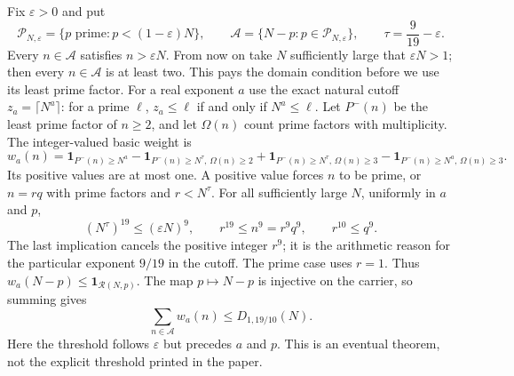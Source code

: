 Fix $\varepsilon>0$ and put
\[
 \mathcal P_{N,\varepsilon}=\{p\text{ prime}:p<(1-\varepsilon)N\},\qquad
 \mathcal A=\{N-p:p\in\mathcal P_{N,\varepsilon}\},\qquad
 \tau=\frac9{19}-\varepsilon.
\]
Every $n\in\mathcal A$ satisfies $n>\varepsilon N$.
From now on take $N$ sufficiently large that $\varepsilon N>1$;
then every $n\in\mathcal A$ is at least two.  This pays the domain
condition before we use its least prime factor.
For a real exponent $a$ use the exact natural cutoff
$z_a=\lceil N^a\rceil$: for a prime $\ell$, $z_a\le\ell$ if and only if
$N^a\le\ell$.  Let $P^-(n)$ be the least prime factor of $n\ge2$,
and let $\Omega(n)$ count prime factors with multiplicity.
The integer-valued basic weight is
\[
 w_a(n)=\mathbf1_{P^-(n)\ge N^a}
 -\mathbf1_{P^-(n)\ge N^\tau,\,\Omega(n)\ge2}
 +\mathbf1_{P^-(n)\ge N^\tau,\,\Omega(n)\ge3}
 -\mathbf1_{P^-(n)\ge N^a,\,\Omega(n)\ge3}.
\]
Its positive values are at most one.  A positive value forces $n$ to be
prime, or $n=rq$ with prime factors and $r<N^\tau$.
For all sufficiently large $N$, uniformly in $a$ and $p$,
\[
 (N^\tau)^{19}\le(\varepsilon N)^9,
 \qquad r^{19}\le n^9=r^9q^9,
 \qquad r^{10}\le q^9.
\]
The last implication cancels the positive integer $r^9$; it is the
arithmetic reason for the particular exponent $9/19$ in the cutoff.
The prime case uses $r=1$.  Thus $w_a(N-p)\le\mathbf1_{\mathcal R(N,p)}$.
The map $p\mapsto N-p$ is injective on the carrier, so summing gives
\[
 \sum_{n\in\mathcal A}w_a(n)\le D_{1,19/10}(N).
\]
Here the threshold follows $\varepsilon$ but precedes $a$ and $p$.
This is an eventual theorem, not the explicit threshold printed in the paper.

